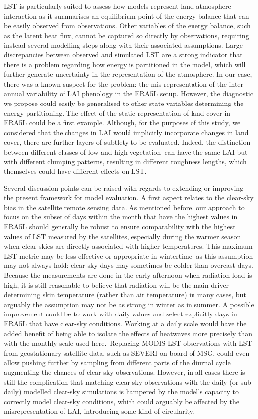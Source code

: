 \documentclass[gmd, manuscript]{copernicus}
\begin{document}
{LST is particularly suited to assess how models represent
land-atmosphere interaction as it summarises an equilibrium point of the
energy balance that can be easily observed from observations. Other
variables of the energy balance, such as the latent heat flux, cannot be
captured so directly by observations, requiring instead several
modelling steps along with their associated assumptions. Large
discrepancies between observed and simulated LST are a strong indicator
that there is a problem regarding how energy is partitioned in the
model, which will further generate uncertainty in the representation of
the atmosphere. In our case, there was a known suspect for the problem:
the mis-representation of the inter-annual variability of LAI phenology
in the ERA5L setup. However, the diagnostic we propose could easily be
generalised to other state variables determining the energy
partitioning. The effect of the static representation of land cover in
ERA5L could be a first example. Although, for the purposes of this
study, we considered that the changes in LAI would implicitly
incorporate changes in land cover, there are further layers of subtlety
to be evaluated. Indeed, the distinction between different classes of
low and high vegetation~can have the same LAI but with different
clumping patterns, resulting in different roughness lengths, which
themselves could have different effects on LST. 

Several discussion points can be raised with regards to extending or
improving the present framework for model evaluation. A first aspect
relates to the clear-sky bias in the satellite remote sensing data. As 
mentioned before, our approach to focus on the subset of days within the 
month that have the highest values in ERA5L should generally be robust to ensure
comparability with the highest values of LST measured by the satellites,
especially during the warmer season when clear skies are directly
associated with higher temperatures. This maximum LST metric may be less
effective or appropriate in wintertime, as this assumption may not
always hold: clear-sky days may sometimes be colder than overcast days.
Because the measurements are done in the early afternoon when radiation
load is high, it is still reasonable to believe that radiation will be
the main driver determining skin temperature (rather than air
temperature) in many cases, but arguably the assumption may not be as
strong in winter as in summer. A possible improvement could be to work
with daily values and select explicitly days in ERA5L that have
clear-sky conditions. Working at a daily scale would have the added
benefit of being able to isolate the effects of heatwaves more precisely
than with the monthly scale used here.~Replacing MODIS LST observations
with LST from geostationary satellite data, such as SEVERI on-board of
MSG, could even allow pushing further by sampling from different parts
of the diurnal cycle augmenting the chances of clear-sky observations.
However, in all cases there is still the complication that matching
clear-sky observations with the daily (or sub-daily) modelled clear-sky
simulations is hampered by the model's capacity to correctly model
clear-sky conditions, which could arguably be affected by the
misrepresentation of LAI, introducing some kind of circularity.

}
\end{document}
